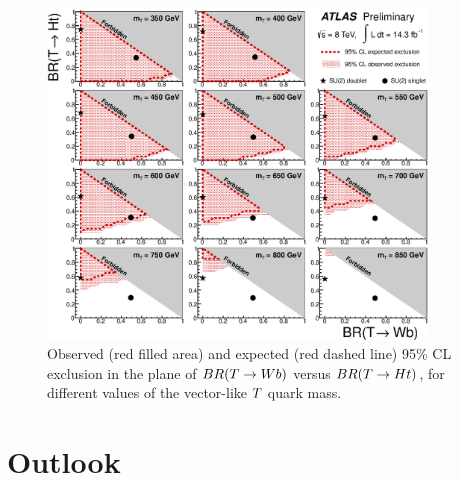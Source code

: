 \begin{figure}[htbp]
\centering
\includegraphics[width=0.9\textwidth]{results/figures/htx/lim_2D.eps}
\caption{
Observed (red filled area) and expected (red dashed line) 95\% CL exclusion in the plane of
$BR(\T \to Wb)$ versus $BR(\T \to Ht)$, for different values of the vector-like $\T$ quark mass.
\label{fig:limits2D_htx}}
\end{figure}






\section{Outlook}\label{sec:htxOUT}

